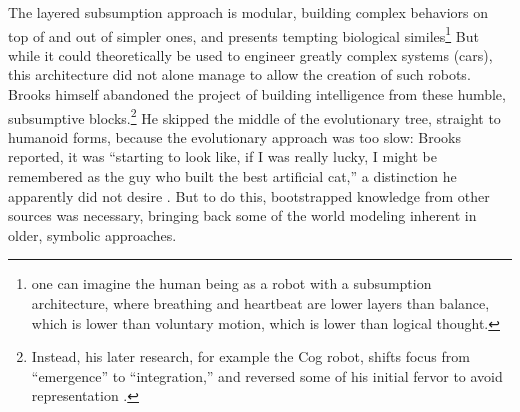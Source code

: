 



The layered subsumption approach is modular, building complex
behaviors on top of and out of simpler ones, and presents tempting
biological similes\footnote{one can imagine the human being as a
robot with a subsumption 
architecture, where breathing and heartbeat are lower layers than balance,
which is lower than voluntary motion, which is lower than logical
thought.} But while it could theoretically be used to engineer greatly
complex systems (cars), this architecture did not alone manage to allow the
creation of such robots.
Brooks himself abandoned the project of building intelligence from
these humble, subsumptive blocks.\footnote{Instead, his later research, for example
the Cog robot, shifts focus from ``emergence'' to ``integration,'' and
reversed some of his initial fervor to avoid representation \cite[p.
  258]{ekbia}.} He skipped the middle of the evolutionary tree, straight
to humanoid forms, because the evolutionary approach was too slow: 
Brooks reported, it was ``starting to look like, if I was really
lucky, I might be remembered as the guy who built the best artificial
cat,'' a distinction he apparently did not desire \cite[p.
  65]{brooksflesh}. But to do this, bootstrapped knowledge from other sources was
necessary, bringing back some of the world modeling inherent in older,
symbolic approaches. 

